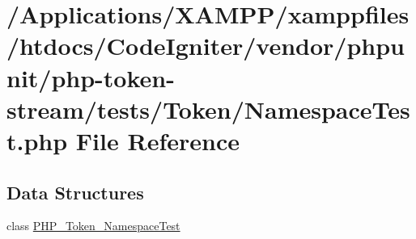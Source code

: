 \hypertarget{_namespace_test_8php}{}\section{/\+Applications/\+X\+A\+M\+P\+P/xamppfiles/htdocs/\+Code\+Igniter/vendor/phpunit/php-\/token-\/stream/tests/\+Token/\+Namespace\+Test.php File Reference}
\label{_namespace_test_8php}
\subsection*{Data Structures}
\begin{DoxyCompactItemize}
\item 
class \mbox{\hyperlink{class_p_h_p___token___namespace_test}{P\+H\+P\+\_\+\+Token\+\_\+\+Namespace\+Test}}
\end{DoxyCompactItemize}
